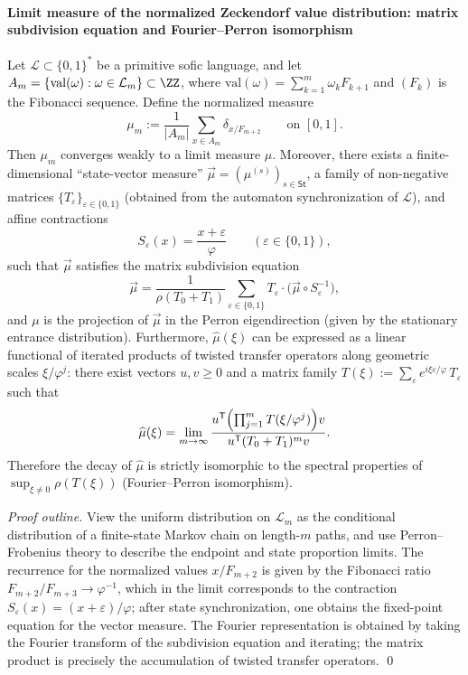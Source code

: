 \paragraph{Limit measure of the normalized Zeckendorf value distribution: matrix subdivision equation and Fourier--Perron isomorphism}
\begin{theorem}\label{thm:gm-zeck-normalized-limit-measure}
Let \(\mathcal{L}\subset\{0,1\}^\ast\) be a primitive sofic language, and let \(A_m=\{\mathrm{val}(\omega):\omega\in\mathcal{L}_m\}\subset\ZZ\), where
\(
\mathrm{val}(\omega)=\sum_{k=1}^{m}\omega_k F_{k+1}
\)
and \((F_k)\) is the Fibonacci sequence.
Define the normalized measure
\[
\mu_m:=\frac{1}{|A_m|}\sum_{x\in A_m}\delta_{x/F_{m+2}}
\qquad\text{on }[0,1].
\]
Then \(\mu_m\) converges weakly to a limit measure \(\mu\).
Moreover, there exists a finite-dimensional ``state-vector measure'' \(\vec\mu=(\mu^{(s)})_{s\in\mathsf{St}}\), a family of non-negative matrices \(\{T_\varepsilon\}_{\varepsilon\in\{0,1\}}\) (obtained from the automaton synchronization of \(\mathcal{L}\)), and affine contractions
\[
S_\varepsilon(x)=\frac{x+\varepsilon}{\varphi}
\qquad(\varepsilon\in\{0,1\}),
\]
such that \(\vec\mu\) satisfies the matrix subdivision equation
\[
\vec\mu
=\frac{1}{\rho(T_0+T_1)}\sum_{\varepsilon\in\{0,1\}}T_\varepsilon\cdot \bigl(\vec\mu\circ S_\varepsilon^{-1}\bigr),
\]
and \(\mu\) is the projection of \(\vec\mu\) in the Perron eigendirection (given by the stationary entrance distribution).
Furthermore, \(\widehat\mu(\xi)\) can be expressed as a linear functional of iterated products of twisted transfer operators along geometric scales \(\xi/\varphi^j\):
there exist vectors \(u,v\ge 0\) and a matrix family
\(
T(\xi):=\sum_{\varepsilon}e^{i\xi\varepsilon/\varphi}\,T_\varepsilon
\)
such that
\[
\widehat\mu(\xi)=\lim_{m\to\infty}\frac{u^{\mathsf T}\Bigl(\prod_{j=1}^{m}T(\xi/\varphi^{j})\Bigr)v}{u^{\mathsf T}(T_0+T_1)^{m}v}.
\]
Therefore the decay of \(\widehat\mu\) is strictly isomorphic to the spectral properties of \(\sup_{\xi\ne 0}\rho(T(\xi))\) (Fourier--Perron isomorphism).
\end{theorem}

\begin{proof}[Proof outline]
View the uniform distribution on \(\mathcal{L}_m\) as the conditional distribution of a finite-state Markov chain on length-\(m\) paths, and use Perron--Frobenius theory to describe the endpoint and state proportion limits.
The recurrence for the normalized values \(x/F_{m+2}\) is given by the Fibonacci ratio \(F_{m+2}/F_{m+3}\to \varphi^{-1}\), which in the limit corresponds to the contraction \(S_\varepsilon(x)=(x+\varepsilon)/\varphi\); after state synchronization, one obtains the fixed-point equation for the vector measure.
The Fourier representation is obtained by taking the Fourier transform of the subdivision equation and iterating; the matrix product is precisely the accumulation of twisted transfer operators. \qed
\end{proof}

